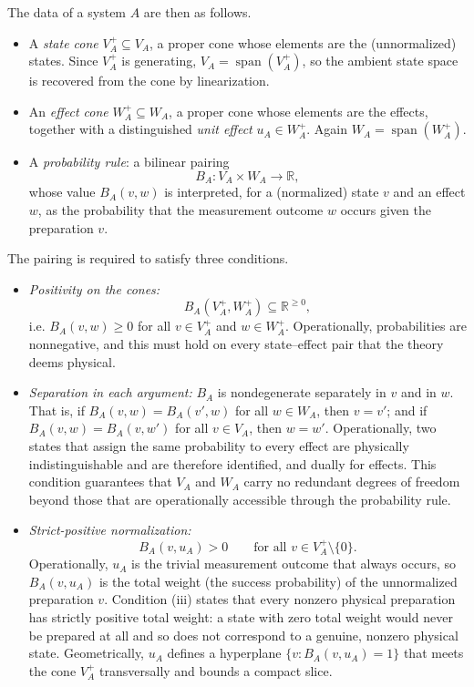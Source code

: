 \documentclass[prl,aps,10pt,superscriptaddress, floatfix]{revtex4-2}
\begin{document}
The data of a system $A$ are then as follows.
\begin{itemize}
\item A \emph{state cone} $V_A^+\subseteq V_A$, a proper cone whose elements are the (unnormalized) states. Since $V_A^+$ is generating, $V_A=\operatorname{span}(V_A^+)$, so the ambient state space is recovered from the cone by linearization.
\item An \emph{effect cone} $W_A^+\subseteq W_A$, a proper cone whose elements are the effects, together with a distinguished \emph{unit effect} $u_A\in W_A^+$. Again $W_A=\operatorname{span}(W_A^+)$.
\item A \emph{probability rule}: a bilinear pairing
\[
B_A : V_A \times W_A \to \mathbb{R},
\]
whose value $B_A(v,w)$ is interpreted, for a (normalized) state $v$ and an effect $w$, as the probability that the measurement outcome $w$ occurs given the preparation $v$.
\end{itemize}

The pairing is required to satisfy three conditions.
\begin{itemize}
\item[(i)] \emph{Positivity on the cones:}
\[
B_A(V_A^+,W_A^+)\subseteq \mathbb{R}^{\ge 0},
\]
i.e. $B_A(v,w)\ge 0$ for all $v\in V_A^+$ and $w\in W_A^+$. Operationally, probabilities are nonnegative, and this must hold on every state--effect pair that the theory deems physical.
\item[(ii)] \emph{Separation in each argument:} $B_A$ is nondegenerate separately in $v$ and in $w$. That is, if $B_A(v,w)=B_A(v',w)$ for all $w\in W_A$, then $v=v'$; and if $B_A(v,w)=B_A(v,w')$ for all $v\in V_A$, then $w=w'$. Operationally, two states that assign the same probability to every effect are physically indistinguishable and are therefore identified, and dually for effects. This condition guarantees that $V_A$ and $W_A$ carry no redundant degrees of freedom beyond those that are operationally accessible through the probability rule.
\item[(iii)] \emph{Strict-positive normalization:}
\[
B_A(v,u_A)>0 \qquad \text{for all } v\in V_A^+\setminus\{0\}.
\]
Operationally, $u_A$ is the trivial measurement outcome that always occurs, so $B_A(v,u_A)$ is the total weight (the success probability) of the unnormalized preparation $v$. Condition (iii) states that every nonzero physical preparation has strictly positive total weight: a state with zero total weight would never be prepared at all and so does not correspond to a genuine, nonzero physical state. Geometrically, $u_A$ defines a hyperplane $\{v: B_A(v,u_A)=1\}$ that meets the cone $V_A^+$ transversally and bounds a compact slice.
\end{itemize}
\end{document}
